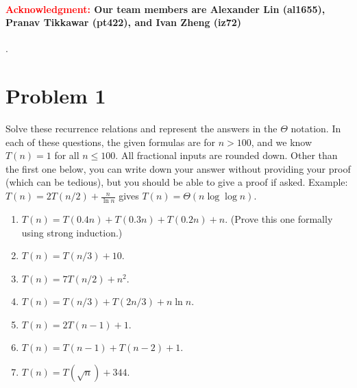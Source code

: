 \paragraph{\textcolor{red}{Acknowledgment:} Our team members are \textbf{Alexander Lin (al1655)}, \textbf{Pranav Tikkawar (pt422)}, and \textbf{Ivan Zheng (iz72)}}.

\section*{Problem 1}
Solve these recurrence relations and represent the answers in the $\Theta$ notation. In each of these questions, the given formulas are for $n > 100$, and we know $T(n) = 1$ for all $n \leq 100$. All fractional inputs are rounded down. Other than the first one below, you can write down your answer without providing your proof (which can be tedious), but you should be able to give a proof if asked. Example: $T(n) = 2T(n/2) + \frac{n}{\ln n}$ gives $T(n) = \Theta(n \log \log n)$.
\begin{enumerate}
    \item $T(n) = T(0.4n) + T(0.3n) + T(0.2n) + n$. (Prove this one formally using strong induction.)
    \item $T(n) = T(n/3) + 10$.
    \item $T(n) = 7 T(n/2) + n^2$.
    \item $T(n) = T(n/3) + T(2n/3) + n \ln n$.
    \item $T(n) = 2T(n - 1) + 1$.
    \item $T(n) = T(n - 1) + T(n - 2) + 1$.
    \item $T(n) = T(\sqrt{n}) + 344$.
\end{enumerate}


